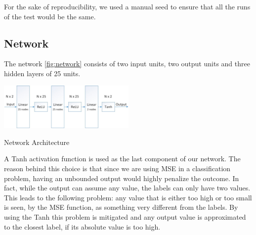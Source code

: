 \documentclass[10pt,conference,compsocconf]{IEEEtran}
\begin{document}
For the sake of reproducibility, we used a manual seed to ensure that all the runs of the test would be the same.

\subsection{Network}
The network \ref{fig:network} consists of two input units, two output units and three hidden layers of 25 units.

\begin{center}
	\captionsetup{type=figure}
	\includegraphics[width=0.5\textwidth]{img/Network.jpg}
	\caption{Network Architecture}
	\label{fig:network}
\end{center} 

A Tanh activation function is used as the last component of our network. The reason behind this choice is that since we are using MSE in a classification problem, having an unbounded output would highly penalize the outcome. In fact, while the output can assume any value, the labels can only have two values. This leads to the following problem: any value that is either too high or too small is seen, by the MSE function, as something very different from the labels. 
By using the Tanh this problem is mitigated and any output value is approximated to the closest label, if its absolute value is too high.
\end{document}
